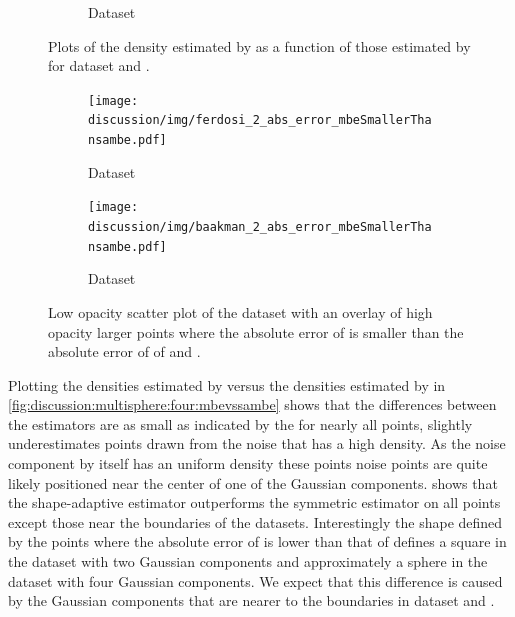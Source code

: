\begin{figure}
\begin{subfigure}{0.23\textwidth}
			\caption{Dataset \baakmanTwo}
			\label{fig:discussion:multisphere:mbevssambe:baakmanTwo}
		\end{subfigure}	
		\caption{Plots of the density estimated by \sambe as a function of those estimated by \mbe for dataset %
			\ferdosiTwo and %
			\baakmanTwo.
		}
		\label{fig:discussion:multisphere:two:mbevssambe}
	\end{figure}

	\begin{figure}
		\centering
		\begin{subfigure}{0.23\textwidth}
			\centering
			\texttt{[image: discussion/img/ferdosi\_2\_abs\_error\_mbeSmallerThansambe.pdf]}
			\caption{Dataset \ferdosiTwo}
			\label{fig:discussion:multisphere:mbeLoweError:ferdosi2}
		\end{subfigure}
		\begin{subfigure}{0.23\textwidth}
			\centering
			\texttt{[image: discussion/img/baakman\_2\_abs\_error\_mbeSmallerThansambe.pdf]}
			\caption{Dataset \baakmanTwo}
			\label{fig:discussion:multisphere:mbeLoweError:baakmanTwo}
		\end{subfigure}	
		\caption{Low opacity scatter plot of the dataset with an overlay of high opacity larger points where the absolute error of \mbe is smaller than the absolute error of \sambe of %
			\ferdosiTwo and %
			\baakmanTwo.
		}
		\label{fig:discussion:multisphere:two:mbeLoweError}
	\end{figure}

	Plotting the densities estimated by \sambe versus the densities estimated by \mbe in \cref{fig:discussion:multisphere:four:mbevssambe} shows that the differences between the estimators are as small as indicated by the \mse for nearly all points, \sambe slightly underestimates points drawn from the noise that has a high density. As the noise component by itself has an uniform density these points noise points are quite likely positioned near the center of one of the Gaussian components.  shows that the shape-adaptive estimator outperforms the symmetric estimator on all points except those near the boundaries of the datasets. 
	Interestingly the shape defined by the points where the absolute error of \mbe is lower than that of \sambe defines a square in the dataset with two Gaussian components and approximately a sphere in the dataset with four Gaussian components. We expect that this difference is caused by the Gaussian components that are nearer to the boundaries in dataset \ferdosiThree and \baakmanThree. 

